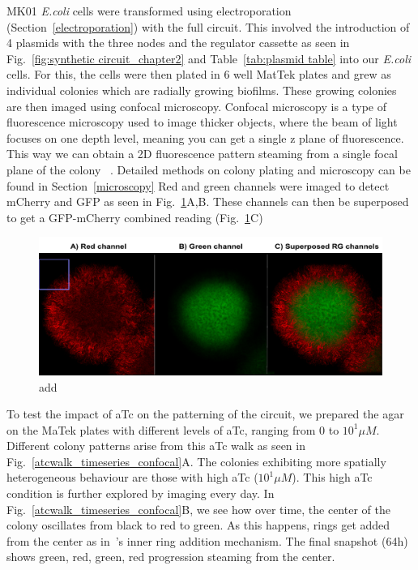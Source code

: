 MK01 \textit{E.coli} cells were transformed using electroporation (Section~\ref{electroporation}) with the full circuit.
This involved the introduction of 4 plasmids with the three nodes and the regulator cassette as seen in Fig.~\ref{fig:synthetic circuit_chapter2} and Table~\ref{tab:plasmid table} into our \textit{E.coli} cells.
For this, the cells were then plated in 6 well MatTek plates and grew as individual colonies which are radially growing biofilms.
These growing colonies are then imaged using confocal microscopy.
Confocal microscopy is a type of fluorescence microscopy used to image thicker objects, where the beam of light focuses on one depth level, meaning you can get a single z plane of fluorescence.
This way we can obtain a 2D fluorescence pattern steaming from a single focal plane of the colony ~\parencite{semwogerere2005confocal}.
 Detailed methods on colony plating and microscopy can be found in Section~\ref{microscopy}
Red and green channels were imaged to detect mCherry and GFP as seen in Fig.~\ref{rgchannels}A,B.
These channels can then be superposed to get a GFP-mCherry combined reading (Fig.~\ref{rgchannels}C)
\begin{figure}[H]

    \includegraphics[width=1\textwidth]{chapters/Chapter 3/rgchannels}
    \caption{add}
    \label{rgchannels}
\end{figure}

To test the impact of aTc on the patterning of the circuit, we prepared the agar on the MaTek plates with different levels of aTc, ranging from 0 to $10^1 \mu M$.
Different colony patterns arise from this aTc walk as seen in Fig.~\ref{atcwalk_timeseries_confocal}A.
The colonies exhibiting more spatially heterogeneous behaviour are those with high aTc ($10^1 \mu M$).
This high aTc condition is further explored by imaging every day.
In Fig.~\ref{atcwalk_timeseries_confocal}B, we see how over time, the center of the colony oscillates from black to red to green.
As this happens, rings get added from the center as in~\cite{Konow2019}'s inner ring addition mechanism.
The final snapshot (64h) shows green, red, green, red progression steaming from the center.

